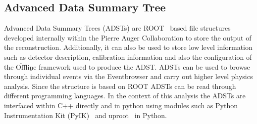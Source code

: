 \subsection{Advanced Data Summary Tree}
\label{sec:ADST}
Advanced Data Summary Trees (ADSTs) are ROOT~\cite{Brun:1997pa} based file structures developed internally within the Pierre Auger Collaboration to store the output of the reconstruction. Additionally, it can also be used to store low level information such as detector description, calibration information and also the configuration of the $\mathrm{\overline{Off}\underline{line}}$ framework used to produce the ADST. ADSTs can be used to browse through individual events via the Eventbrowser and carry out higher level physics analysis. Since the structure is based on ROOT ADSTs can be read through different programming languages. In the context of this analysis the ADSTs are interfaced within C++ directly and in python using modules such as Python Instrumentation Kit (PyIK)~\cite{HDembinski_pyik} and uproot~\cite{Pivarski2024-za} in Python. 










